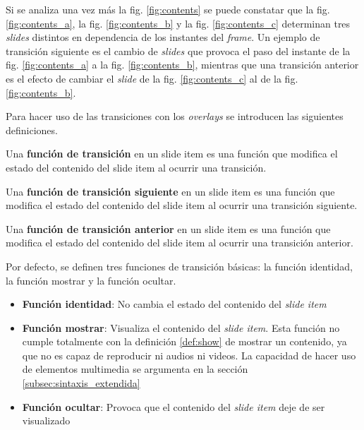  		Si se analiza una vez más la fig. \ref{fig:contents} se puede constatar que la fig. \ref{fig:contents_a}, la fig. \ref{fig:contents_b} y la fig. \ref{fig:contents_c} determinan tres \textit{slides} distintos en dependencia de los instantes del \textit{frame}. Un ejemplo de transición siguiente es el cambio de \textit{slides} que provoca el paso del instante de la fig. \ref{fig:contents_a} a la fig. \ref{fig:contents_b}, mientras que una transición anterior es el efecto de cambiar el \textit{slide} de la fig. \ref{fig:contents_c} al de la fig. \ref{fig:contents_b}.


		Para hacer uso de las transiciones con los \textit{overlays} se introducen las siguientes definiciones.

		\begin{definition}
		\label{def:transition_func}
			Una \textbf{función de transición} en un \textnormal{slide item} es una función que modifica el estado del contenido del \textnormal{slide item} al ocurrir una transición.
		\end{definition}

		\begin{definition}
		\label{def:next_transition_func}
			Una \textbf{función de transición siguiente} en un \textnormal{slide item} es una función que modifica el estado del contenido del \textnormal{slide item} al ocurrir una transición siguiente.
		\end{definition}

		\begin{definition}
		\label{def:prev_transition_func}
			Una \textbf{función de transición anterior} en un \textnormal{slide item} es una función que modifica el estado del contenido del \textnormal{slide item} al ocurrir una transición anterior.
		\end{definition}

		Por defecto, se definen tres funciones de transición básicas: la función identidad, la función mostrar y la función ocultar.
		\begin{itemize}
		\label{it:basic_functions}
			\item \textbf{Función identidad}: No cambia el estado del contenido del \textit{slide item}
			\item \textbf{Función mostrar}: Visualiza el contenido del \textit{slide item}. Esta función no cumple totalmente con la definición \ref{def:show} de mostrar un contenido, ya que no es capaz de reproducir ni audios ni videos. La capacidad de hacer uso de elementos multimedia se argumenta en la sección \ref{subsec:sintaxis_extendida} 
			\item \textbf{Función ocultar}: Provoca que el contenido del \textit{slide item} deje de ser visualizado
		\end{itemize}

